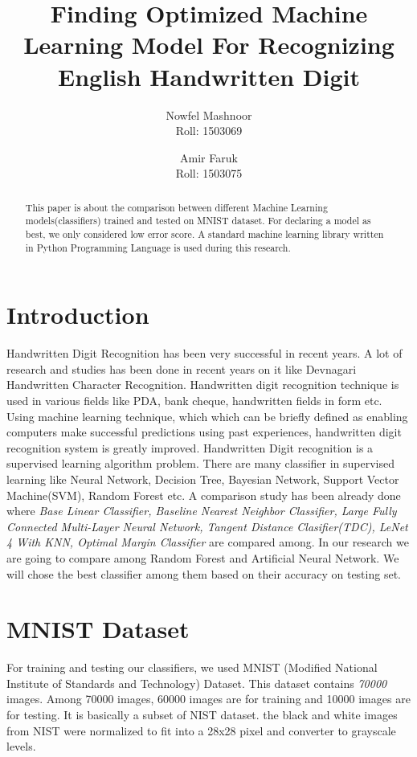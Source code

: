 \documentclass[12pt,a4paper]{article}
\title{Finding Optimized Machine Learning Model For Recognizing English Handwritten Digit}
\author{Nowfel Mashnoor\\Roll: 1503069\and Amir Faruk\\Roll: 1503075}
\begin{document}
\date{}
\maketitle

\begin{abstract}
This paper is about the comparison between different Machine Learning models(classifiers) trained and tested on MNIST dataset. For declaring a model as best, we only considered low error score. A standard machine learning library written in Python Programming Language is used during this research. 
\end{abstract}

\section{Introduction}

Handwritten Digit Recognition has been very successful in recent years. A lot of research and studies has been done in recent years on it like Devnagari Handwritten Character Recognition\cite{pal2009comparative}. Handwritten digit recognition technique is used in various fields like PDA, bank cheque, handwritten fields in form etc.\cite{plamondon2000online} Using machine learning technique, which which can be briefly defined as enabling computers make successful predictions using past experiences, \cite{bacstanlar2014introduction} handwritten digit recognition system is greatly improved. Handwritten Digit recognition is a supervised learning algorithm problem. There are many classifier in supervised learning like Neural Network, Decision Tree,  Bayesian Network, Support Vector Machine(SVM), Random Forest etc\cite{kotsiantis2007supervised}. A comparison study has been already done where \textit{Base Linear Classifier, Baseline Nearest Neighbor Classifier, Large Fully Connected Multi-Layer Neural Network, Tangent Distance Clasifier(TDC), LeNet 4 With KNN, Optimal Margin Classifier} are compared among.\cite{lecun1995learning} In our research we are going to compare among Random Forest and Artificial Neural Network. We will chose the best classifier among them based on their accuracy on testing set. 

\section{MNIST Dataset}

For training and testing our classifiers, we used MNIST (Modified National Institute of Standards and Technology) Dataset. This dataset contains \textit{70000} images. Among 70000 images, 60000 images are for training and 10000 images are for testing\cite{kussul2004improved}.  It is basically a subset of NIST dataset. the black and white images from NIST were normalized to fit into a 28x28 pixel and converter to grayscale levels.\cite{lecuncourant}
\end{document}

